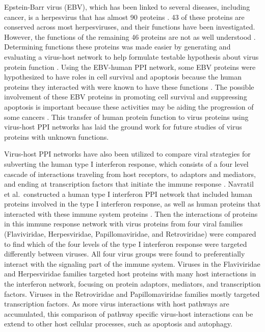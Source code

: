 Epstein-Barr virus (EBV), which has been linked to several diseases,
including cancer, is a herpesvirus that has almost 90 proteins
\cite{calderwood07}. 43 of these proteins are conserved across most
herpesviruses, and their functions have been investigated. However,
the functions of the remaining 46 proteins are not as well understood
\cite{calderwood07}. Determining functions these proteins was made
easier by generating and evaluating a virus-host network to help
formulate testable hypothesis about virus protein function
\cite{calderwood07}. Using the EBV-human PPI network, some EBV
proteins were hypothesized to have roles in cell survival and
apoptosis because the human proteins they interacted with were known
to have these functions \cite{calderwood07}. The possible involvement
of these EBV proteins in promoting cell survival and suppressing
apoptosis is important because these activities may be aiding the
progression of some cancers \cite{young2004epstein}. This transfer of
human protein function to virus proteins using virus-host PPI networks
has laid the ground work for future studies of virus proteins with
unknown functions.

Virus-host PPI networks have also been utilized to compare viral
strategies for subverting the human type I interferon response, which
consists of a four level cascade of interactions traveling from host
receptors, to adaptors and mediators, and ending at transcription
factors that initiate the immune response
\cite{navratil-system}. Navratil et al.\ constructed a human type I
interferon PPI network that included human proteins involved in the
type I interferon response, as well as human proteins that interacted
with these immune system proteins \cite{navratil-system}. Then the
interactions of proteins in this immune response network with virus
proteins from four viral families (Flaviviridae, Herpesviridae,
Papillomaviridae, and Retroviridae) were compared to find which of the
four levels of the type I interferon response were targeted
differently between viruses. All four virus groups were found to
preferentially interact with the signaling part of the immune
system. Viruses in the Flaviviridae and Herpesviridae families
targeted host proteins with many host interactions in the interferon
network, focusing on protein adaptors, mediators, and transcription
factors. Viruses in the Retroviridae and Papillomaviridae families
mostly targeted transcription factors. As more virus interactions with
host pathways are accumulated, this comparison of pathway specific
virus-host interactions can be extend to other host cellular
processes, such as apoptosis and autophagy.

